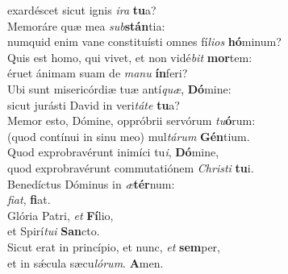 \oddverse exardéscet sicut ignis \textit{i}\textit{ra} \textbf{tu}a?\\
\evenverse Memoráre quæ mea \textit{sub}\textbf{stán}tia:~\*\\
\evenverse numquid enim vane constituísti omnes fí\textit{li}\textit{os} \textbf{hó}minum?\\
\oddverse Quis est homo, qui vivet, et non vidé\textit{bit} \textbf{mor}tem:~\*\\
\oddverse éruet ánimam suam de \textit{ma}\textit{nu} \textbf{ín}feri?\\
\evenverse Ubi sunt misericórdiæ tuæ antí\textit{quæ}, \textbf{Dó}mine:~\*\\
\evenverse sicut jurásti David in veri\textit{tá}\textit{te} \textbf{tu}a?\\
\oddverse Memor esto, Dómine, oppróbrii servórum \textit{tu}\textbf{ó}rum:~\*\\
\oddverse (quod contínui in sinu meo) mul\textit{tá}\textit{rum} \textbf{Gén}tium.\\
\evenverse Quod exprobravérunt inimíci tu\textit{i}, \textbf{Dó}mine,~\*\\
\evenverse quod exprobravérunt commutatiónem \textit{Chri}\textit{sti} \textbf{tu}i.\\
\oddverse Benedíctus Dóminus in \textit{æ}\textbf{tér}num:~\*\\
\oddverse \textit{fi}\textit{at}, \textbf{fi}at.\\
\evenverse Glória Patri, \textit{et} \textbf{Fí}lio,~\*\\
\evenverse et Spirí\textit{tu}\textit{i} \textbf{San}cto.\\
\oddverse Sicut erat in princípio, et nunc, \textit{et} \textbf{sem}per,~\*\\
\oddverse et in sǽcula sæcu\textit{ló}\textit{rum}. \textbf{A}men.\\
